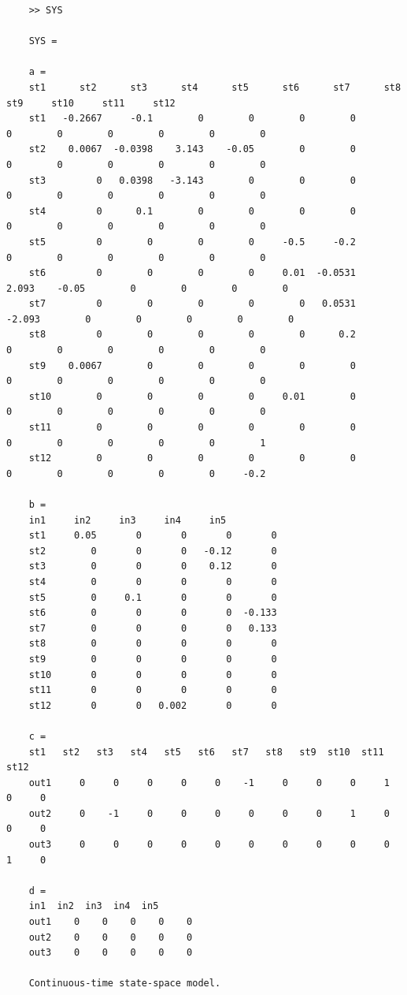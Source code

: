\documentclass[14pt,a4paper]{article}
\begin{document}
	\begin{lstlisting}
	>> SYS
	
	SYS =
	
	a = 
	st1      st2      st3      st4      st5      st6      st7      st8      st9     st10     st11     st12
	st1   -0.2667     -0.1        0        0        0        0        0        0        0        0        0        0
	st2    0.0067  -0.0398    3.143    -0.05        0        0        0        0        0        0        0        0
	st3         0   0.0398   -3.143        0        0        0        0        0        0        0        0        0
	st4         0      0.1        0        0        0        0        0        0        0        0        0        0
	st5         0        0        0        0     -0.5     -0.2        0        0        0        0        0        0
	st6         0        0        0        0     0.01  -0.0531    2.093    -0.05        0        0        0        0
	st7         0        0        0        0        0   0.0531   -2.093        0        0        0        0        0
	st8         0        0        0        0        0      0.2        0        0        0        0        0        0
	st9    0.0067        0        0        0        0        0        0        0        0        0        0        0
	st10        0        0        0        0     0.01        0        0        0        0        0        0        0
	st11        0        0        0        0        0        0        0        0        0        0        0        1
	st12        0        0        0        0        0        0        0        0        0        0        0     -0.2
	
	b = 
	in1     in2     in3     in4     in5
	st1     0.05       0       0       0       0
	st2        0       0       0   -0.12       0
	st3        0       0       0    0.12       0
	st4        0       0       0       0       0
	st5        0     0.1       0       0       0
	st6        0       0       0       0  -0.133
	st7        0       0       0       0   0.133
	st8        0       0       0       0       0
	st9        0       0       0       0       0
	st10       0       0       0       0       0
	st11       0       0       0       0       0
	st12       0       0   0.002       0       0
	
	c = 
	st1   st2   st3   st4   st5   st6   st7   st8   st9  st10  st11  st12
	out1     0     0     0     0     0    -1     0     0     0     1     0     0
	out2     0    -1     0     0     0     0     0     0     1     0     0     0
	out3     0     0     0     0     0     0     0     0     0     0     1     0
	
	d = 
	in1  in2  in3  in4  in5
	out1    0    0    0    0    0
	out2    0    0    0    0    0
	out3    0    0    0    0    0
	
	Continuous-time state-space model.
		
	\end{lstlisting}
	
\end{document}
